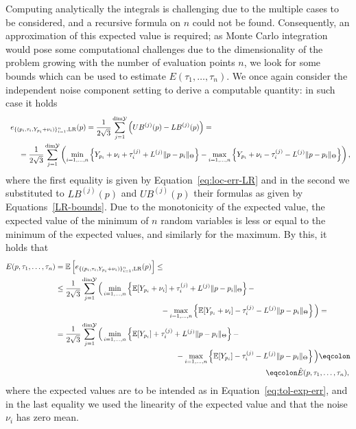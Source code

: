 Computing analytically the integrals is challenging due to the multiple cases to be considered, and a recursive formula on $n$ could not be found. 
Consequently, an approximation of this expected value is required; as Monte Carlo integration would pose some computational challenges due to the dimensionality of the problem growing with the number of evaluation points $n$, we look for some bounds which can be used to estimate $E(\tau_1,\dots, \tau_n)$.\newline
We once again consider the independent noise component setting to derive a computable quantity: in such case it holds
\begin{gather*}
    e_{\{(p_i,\tau_{i}, Y_{p_i} + \nu_i )\}_{i=1}^n, \text{LR}}(p)  = 
    \frac{1}{2\sqrt{3}} \sum_{j=1}^{\text{dim}\mathcal Y} \left( UB^{(j)}(p) - LB^{(j)}(p) \right) = \qquad \qquad \qquad \qquad \qquad\qquad \qquad\qquad \qquad  \\
    \qquad = \frac{1}{2\sqrt{3}} \sum_{j=1}^{\text{dim}\mathcal Y} 
    \left( \min_{i=1,\dots,n}\left\{ Y_{p_i} + \nu_i + \tau_{i}^{(j)} + L^{(j)} \| p - p_i \|_\Theta \right\}- \max_{i=1,\dots,n} \left\{ Y_{p_i} + \nu_i - \tau_i^{(j)} - L^{(j)} \| p - p_i \|_\Theta \right\} \right),
\end{gather*} 
where the first equality is given by Equation~\eqref{eq:loc-err-LR} and in the second we substituted to $LB^{(j)}(p)$ and $UB^{(j)}(p)$ their formulas as given by Equations~\eqref{LR-bounds}.\newline
Due to the monotonicity of the expected value, the expected value of the minimum of $n$ random variables is less or equal to the minimum of the expected values, and similarly for the maximum. 
By this, it holds that 
\begin{align*}
    E(p, \tau_1, \dots, \tau_n) &=\bb E\left[ 
        e_{\{(p_i,\tau_{i}, Y_{p_i} + \nu_i )\}_{i=1}^n, \text{LR}}(p)
   \right] \leq\\
   &\leq \frac{1}{2\sqrt{3}} \sum_{j=1}^{\text{dim}\mc Y} 
    \Big( \min_{i=1,\dots,n}\left\{ \bb E[Y_{p_i} + \nu_i] + \tau_i^{(j)} + L^{(j)} \| p - p_i \|_\Theta \right\}- \\
    & \qquad\qquad \qquad\qquad\qquad \qquad \qquad -\max_{i=1,\dots,n} \left\{ \bb E[Y_{p_i} + \nu_i] - \tau_i^{(j)} - L^{(j)} \| p - p_i \|_\Theta \right\} \Big) = \\
    &= \frac{1}{2\sqrt{3}} \sum_{j=1}^{\text{dim}\mc Y} \Big(  \min_{i=1,\dots, n}\left\{ \bb E[Y_{p_i}] + \tau_i^{(j)} + L^{(j)} \| p - p_i \|_\Theta \right\}- \\
    & \qquad\qquad\qquad \qquad\qquad\qquad \qquad \qquad - \max_{i=1,\dots,n} \left\{ \bb E[Y_{p_i} ] - \tau_i^{(j)} - L^{(j)} \| p - p_i \|_\Theta \right\} \Big)\eqcolon \\ 
    & \qquad\qquad \qquad\qquad\qquad \qquad \qquad  \qquad\qquad \qquad\qquad\qquad \qquad \qquad 
     \eqcolon\hat E(p, \tau_1, \dots, \tau_n),
\end{align*}
where the expected values are to be intended as in Equation~\eqref{eq:tol-exp-err}, and in the last equality we used the linearity of the expected value and that the noise $\nu_i$ has zero mean. \medskip

